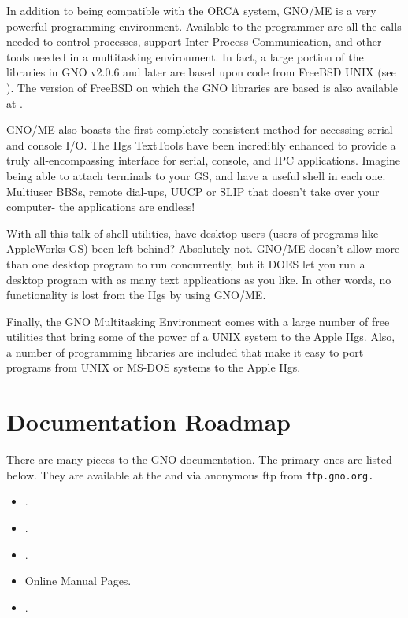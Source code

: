 \documentclass{report}
\begin{document}
In addition to being compatible with the
ORCA system, GNO/ME is a very powerful programming environment.
Available to the programmer are all the calls needed to control
processes, support Inter-Process Communication, and other tools
needed in a multitasking environment.
In fact, a large portion of the libraries in GNO v2.0.6 and later
are based upon code from FreeBSD UNIX (see ).
The version of FreeBSD on which the GNO libraries are based is also
available at .

GNO/ME also boasts the first completely
consistent method for accessing serial and console I/O. The IIgs
TextTools have been incredibly enhanced to provide a truly
all-encompassing interface for serial, console, and IPC
applications. Imagine being able to attach terminals to your GS,
and have a useful shell in each one. Multiuser BBSs, remote
dial-ups, UUCP or SLIP that doesn't take over your computer- the
applications are endless!

With all this talk of shell utilities, have
desktop users (users of programs like AppleWorks GS) been left
behind? Absolutely not. GNO/ME doesn't allow more than one
desktop program to run concurrently, but it DOES let you run a
desktop program with as many text applications as you like. In
other words, no functionality is lost from the IIgs by using
GNO/ME.

Finally, the GNO Multitasking Environment
comes with a large number of free utilities that bring some of
the power of a UNIX system to the Apple IIgs. Also, a number of
programming libraries are included that make it easy to port
programs from UNIX or MS-DOS systems to the Apple IIgs.

%
%


\section{Documentation Roadmap}

There are many pieces to the GNO documentation.  The primary ones are
listed below.  They are available
at the  and via anonymous ftp from
\tt ftp.gno.org\rm.

\begin{itemize}
\item	{}.
\item	{}.
\item	{}.
\item	Online Manual Pages.
\item	{}.
\end{itemize}
\end{document}

